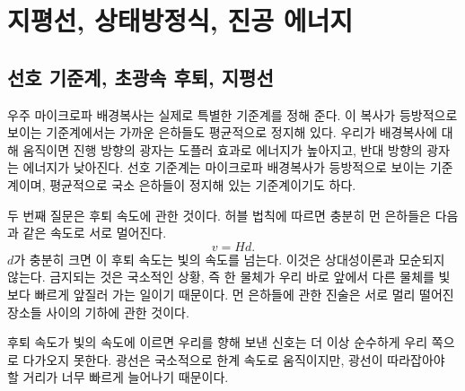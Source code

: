 \chapter{지평선, 상태방정식, 진공 에너지}

\section{선호 기준계, 초광속 후퇴, 지평선}

우주 마이크로파 배경복사는 실제로 특별한 기준계를 정해 준다. 이 복사가 등방적으로 보이는 기준계에서는 가까운 은하들도 평균적으로 정지해 있다. 우리가 배경복사에 대해 움직이면 진행 방향의 광자는 도플러 효과로 에너지가 높아지고, 반대 방향의 광자는 에너지가 낮아진다. 선호 기준계는 마이크로파 배경복사가 등방적으로 보이는 기준계이며, 평균적으로 국소 은하들이 정지해 있는 기준계이기도 하다.

\begin{classroomqa}
\end{classroomqa}

두 번째 질문은 후퇴 속도에 관한 것이다. 허블 법칙에 따르면 충분히 먼 은하들은 다음과 같은 속도로 서로 멀어진다.
\begin{equation}
v = H d .
\end{equation}
\(d\)가 충분히 크면 이 후퇴 속도는 빛의 속도를 넘는다. 이것은 상대성이론과 모순되지 않는다. 금지되는 것은 국소적인 상황, 즉 한 물체가 우리 바로 앞에서 다른 물체를 빛보다 빠르게 앞질러 가는 일이기 때문이다. 먼 은하들에 관한 진술은 서로 멀리 떨어진 장소들 사이의 기하에 관한 것이다.

\begin{classroomqa}
\end{classroomqa}

후퇴 속도가 빛의 속도에 이르면 우리를 향해 보낸 신호는 더 이상 순수하게 우리 쪽으로 다가오지 못한다. 광선은 국소적으로 한계 속도로 움직이지만, 광선이 따라잡아야 할 거리가 너무 빠르게 늘어나기 때문이다.

